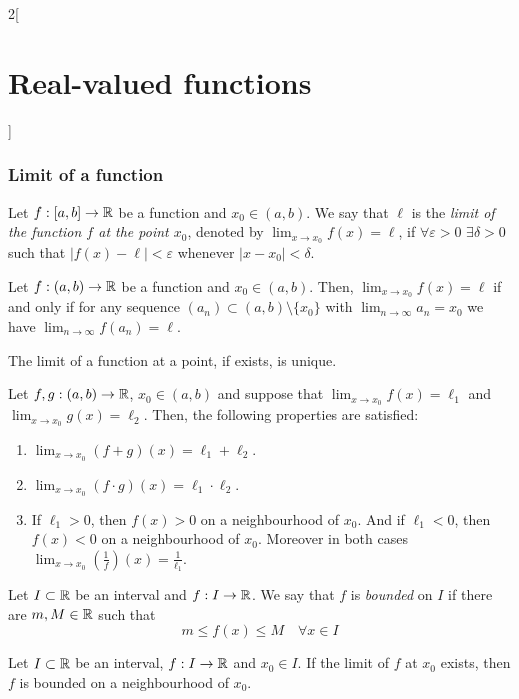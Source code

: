 \documentclass[../../../main.tex]{subfiles}
\begin{document}
\begin{multicols}{2}[\section{Real-valued functions}]
  \subsubsection{Limit of a function}
  \begin{definition}
    Let $f:[a,b]\rightarrow\mathbb{R}$ be a function and $x_0\in(a,b)$. We say that $\ell$ is the \emph{limit of the function $f$ at the point $x_0$}, denoted by $\displaystyle\lim_{x\to x_0}f(x)=\ell$, if $\forall\varepsilon>0$ $\exists\delta>0$ such that $|f(x)-\ell|<\varepsilon$ whenever $|x-x_0|<\delta$.
  \end{definition}
  \begin{lemma}
    Let $f:(a,b)\rightarrow\mathbb{R}$ be a function and $x_0\in(a,b)$. Then, $\displaystyle\lim_{x\to x_0}f(x)=\ell$ if and only if for any sequence $(a_n)\subset(a,b)\setminus\{x_0\}$ with $\displaystyle\lim_{n\to\infty} a_n=x_0$ we have $\displaystyle\lim_{n\to\infty}  f(a_n)=\ell$.
  \end{lemma}
  \begin{lemma}
    The limit of a function at a point, if exists, is unique.
  \end{lemma}
  \begin{proposition}
    Let $f,g:(a,b)\rightarrow\mathbb{R}$, $x_0\in(a,b)$ and suppose that $\displaystyle\lim_{x\to x_0}f(x)=\ell_1$ and $\displaystyle\lim_{x\to x_0}g(x)=\ell_2$. Then, the following properties are satisfied:
    \begin{enumerate}
      \item $\displaystyle\lim_{x\to x_0}(f+g)(x)=\ell_1+\ell_2$.
      \item $\displaystyle\lim_{x\to x_0}(f\cdot g)(x)=\ell_1\cdot\ell_2$.
      \item If $\ell_1>0$, then $f(x)>0$ on a neighbourhood of $x_0$. And if $\ell_1<0$, then $f(x)<0$ on a neighbourhood of $x_0$. Moreover in both cases $\displaystyle\lim_{x\to x_0}\left(\frac{1}{f}\right)(x)=\frac{1}{\ell_1}$.
    \end{enumerate}
  \end{proposition}
  \begin{definition}
    Let $I\subset\mathbb{R}$ be an interval and $f:I\rightarrow\mathbb{R}$. We say that $f$ is \emph{bounded} on $I$ if there are $m,M\in\mathbb{R}$ such that $$m\leq f(x)\leq M\quad\forall x\in I$$
  \end{definition}
  \begin{lemma}
    Let $I\subset\mathbb{R}$ be an interval, $f:I\rightarrow\mathbb{R}$ and $x_0\in I$. If the limit of $f$ at $x_0$ exists, then $f$ is bounded on a neighbourhood of $x_0$.

\end{lemma}
\end{multicols}
\end{document}

